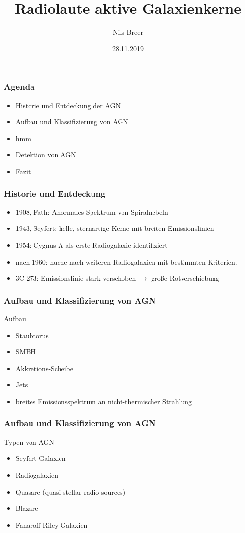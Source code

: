 \documentclass[aspectratio=1610, 9pt]{beamer}
\title{Radiolaute aktive Galaxienkerne}
\author[N.Breer]{Nils Breer}
\institute{Fakultät Physik}
\date{28.11.2019}
\begin{document}
\maketitle

\begin{frame}\frametitle{Agenda}
  \begin{itemize}
    \item Historie und Entdeckung der AGN
    \item Aufbau und Klassifizierung von AGN
    \item hmm
    \item Detektion von AGN
    \item Fazit
  \end{itemize}
\end{frame}

\begin{frame}\frametitle{Historie und Entdeckung}
  \begin{itemize}
    \item 1908, Fath: Anormales Spektrum von Spiralnebeln
    \item 1943, Seyfert: helle, sternartige Kerne mit breiten Emissionslinien
    \item 1954: Cygnus A als erste Radiogalaxie identifiziert
    \item nach 1960: nuche nach weiteren Radiogalaxien mit bestimmten Kriterien.
    \item 3C 273: Emissionslinie stark verschoben $\to$ gro\ss e Rotverschiebung
  \end{itemize}
\end{frame}


\begin{frame}\frametitle{Aufbau und Klassifizierung von AGN}
  \begin{block}{Aufbau}
  \begin{itemize}
    \item Staubtorus
    \item SMBH
    \item Akkretions-Scheibe
    \item Jets
    \item breites Emissionsspektrum an nicht-thermischer Strahlung
  \end{itemize}
  \end{block}
\end{frame}

\begin{frame}\frametitle{Aufbau und Klassifizierung von AGN}
  \begin{block}{Typen von AGN}
    \begin{itemize}
      \item Seyfert-Galaxien
      \item Radiogalaxien
      \item Quasare (quasi stellar radio sources)
      \item Blazare
      \item Fanaroff-Riley Galaxien
    \end{itemize}
  \end{block}
\end{frame}
\end{document}
